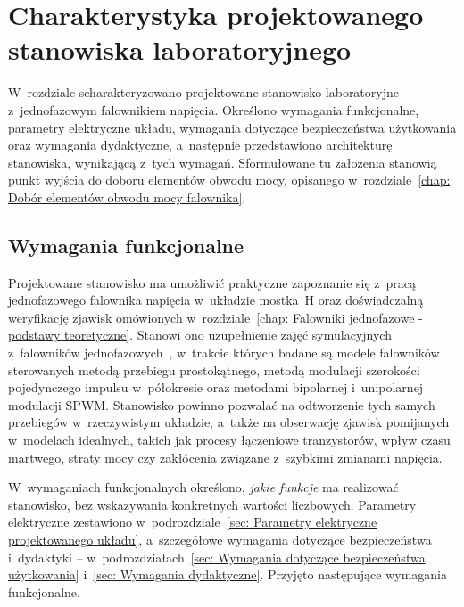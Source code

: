 \chapter{Charakterystyka projektowanego stanowiska laboratoryjnego}
\label{chap: Charakterystyka projektowanego stanowiska laboratoryjnego}

W~rozdziale scharakteryzowano projektowane stanowisko laboratoryjne
z~jednofazowym falownikiem napięcia. Określono wymagania funkcjonalne,
parametry elektryczne układu, wymagania dotyczące bezpieczeństwa
użytkowania oraz wymagania dydaktyczne, a~następnie przedstawiono
architekturę stanowiska, wynikającą z~tych wymagań. Sformułowane tu
założenia stanowią punkt wyjścia do doboru elementów obwodu mocy, opisanego
w~rozdziale~\ref{chap: Dobór elementów obwodu mocy falownika}.

\section{Wymagania funkcjonalne}
\label{sec: Wymagania funkcjonalne}

Projektowane stanowisko ma umożliwić praktyczne zapoznanie się z~pracą
jednofazowego falownika napięcia w~układzie mostka~H oraz doświadczalną
weryfikację zjawisk omówionych w~rozdziale~\ref{chap: Falowniki jednofazowe - podstawy teoretyczne}.
Stanowi ono uzupełnienie zajęć symulacyjnych z~falowników
jednofazowych~\cite{instrukcja}, w~trakcie których badane są modele
falowników sterowanych metodą przebiegu prostokątnego, metodą modulacji
szerokości pojedynczego impulsu w~półokresie oraz metodami bipolarnej
i~unipolarnej modulacji SPWM. Stanowisko powinno pozwalać na
odtworzenie tych samych przebiegów w~rzeczywistym układzie, a~także na
obserwację zjawisk pomijanych w~modelach idealnych, takich jak procesy
łączeniowe tranzystorów, wpływ czasu martwego, straty mocy czy zakłócenia
związane z~szybkimi zmianami napięcia.

W~wymaganiach funkcjonalnych określono, \emph{jakie funkcje} ma realizować
stanowisko, bez wskazywania konkretnych wartości liczbowych. Parametry
elektryczne zestawiono w~podrozdziale~\ref{sec: Parametry elektryczne projektowanego układu},
a~szczegółowe wymagania dotyczące bezpieczeństwa i~dydaktyki --
w~podrozdziałach~\ref{sec: Wymagania dotyczące bezpieczeństwa użytkowania}
i~\ref{sec: Wymagania dydaktyczne}. Przyjęto następujące wymagania
funkcjonalne.

